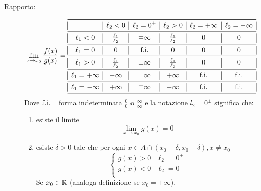 \begin{teo}
\begin{description}
\item[Rapporto:]
\[\lim_{x\to x_0}{\frac{f(x)}{g(x)}}=
\begin{array}{ |*{6}{c|} }
\toprule
& \ell_2<0 & \ell_2=0^{\pm} & \ell_2>0 & \ell_2=+\infty & \ell_2=-\infty\\
\midrule
\ell_1<0 & \frac{\ell_1}{\ell_2} & \mp\infty & \frac{\ell_1}{\ell_2} & 0 & 0 \\
\midrule
\ell_1=0 & 0 & \foi & 0 & 0 & 0 \\
\midrule
\ell_1>0 & \frac{\ell_1}{\ell_2} & \pm\infty & \frac{\ell_1}{\ell_2} & 0 & 0 \\
\midrule
\ell_1=+\infty & -\infty & \pm\infty & +\infty & \foi & \foi \\
\midrule
\ell_1=-\infty & +\infty & \mp\infty & -\infty & \foi & \foi \\
\bottomrule
\end{array}
\]
Dove $\text{f.i.}$= forma indeterminata $\frac{0}{0}$ o $\frac{\infty}{\infty}$ e la notazione $l_2=0^\pm$ significa che:
\begin{enumerate}
\item esiste il limite
\[\lim_{x\to x_0}{g(x)}=0\]
\item esiste $\delta>0$ tale che per ogni $x\in A \cap (x_0-\delta,x_0+\delta), x\neq x_0$
\[\begin{cases}
g(x)>0 & \ell_2 = 0^+ \\
g(x)<0 & \ell_2 = 0^- \\
\end{cases}\]
Se $x_0 \in \mathbb{R}$ (analoga definizione se $x_0=\pm\infty$).
\end{enumerate}
\end{description}
\end{teo}

